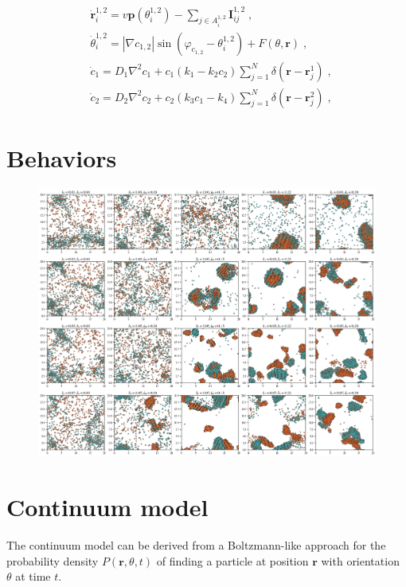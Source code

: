 \documentclass{article}
\begin{document}
\begin{subequations}
    \begin{align}
        &\dot{\mathbf{r}}_{i}^{1,2}=v\mathbf{p}\left( \theta _{i}^{1,2} \right) -\sum_{j\in A_{i}^{1,2}}{\mathbf{I}_{ij}^{1,2}\;,}\\
        &\dot{\theta}_{i}^{1,2}=\left| \nabla c_{1,2} \right|\sin \left( \varphi _{c_{1,2}}-\theta _{i}^{1,2} \right) +F\left( \theta ,\mathbf{r} \right) \;,\\
        &\dot{c}_1=D_1\nabla ^2c_1+c_1\left( k_1-k_2c_2 \right) \sum_{j=1}^N{\delta \left( \mathbf{r}-\mathbf{r}_{j}^{1} \right) \;,}\\
        &\dot{c}_2=D_2\nabla ^2c_2+c_2\left( k_3c_1-k_4 \right) \sum_{j=1}^N{\delta \left( \mathbf{r}-\mathbf{r}_{j}^{2} \right) \;,}
    \end{align}
\end{subequations}

\section{Behaviors}
\begin{figure}
    \centering
    \includegraphics[width=\textwidth]{figs/bigGraphParticle_k23_0.5.png}
\end{figure}


\section{Continuum model}
The continuum model can be derived from a Boltzmann-like approach for the probability density $P(\mathbf{r}, \theta, t)$ of finding a particle at position $\mathbf{r}$ with orientation $\theta$ at time $t$. 




% 
\end{document}
